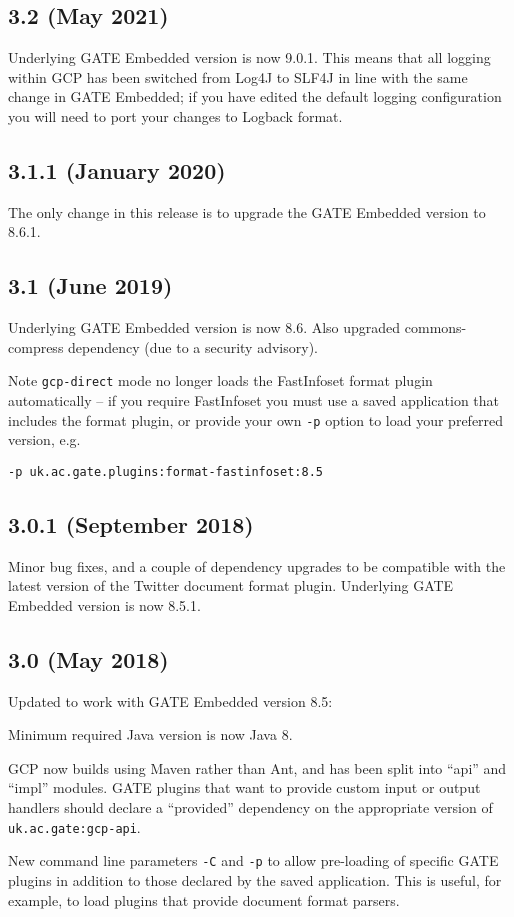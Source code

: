 \subsection{3.2 (May 2021)}

Underlying GATE Embedded version is now 9.0.1.  This means that all logging
within GCP has been switched from Log4J to SLF4J in line with the same change
in GATE Embedded; if you have edited the default logging configuration you
will need to port your changes to Logback format.

\subsection{3.1.1 (January 2020)}

The only change in this release is to upgrade the GATE Embedded version to
8.6.1.

\subsection{3.1 (June 2019)}

Underlying GATE Embedded version is now 8.6.  Also upgraded commons-compress
dependency (due to a security advisory).

Note \verb!gcp-direct! mode no longer loads the FastInfoset format plugin
automatically -- if you require FastInfoset you must use a saved application
that includes the format plugin, or provide your own \verb!-p! option to load
your preferred version, e.g.
\begin{verbatim}
-p uk.ac.gate.plugins:format-fastinfoset:8.5
\end{verbatim}

\subsection{3.0.1 (September 2018)}

Minor bug fixes, and a couple of dependency upgrades to be compatible with the
latest version of the Twitter document format plugin.  Underlying GATE Embedded
version is now 8.5.1.

\subsection{3.0 (May 2018)}

Updated to work with GATE Embedded version 8.5:
\bit
\item Minimum required Java version is now Java 8.
\item GCP now builds using Maven rather than Ant, and has been split into
  ``api'' and ``impl'' modules. GATE plugins that want to provide custom input
  or output handlers should declare a ``provided'' dependency on the
  appropriate version of \verb!uk.ac.gate:gcp-api!.
\item New command line parameters \verb!-C! and \verb!-p! to allow pre-loading
  of specific GATE plugins in addition to those declared by the saved
  application.  This is useful, for example, to load plugins that provide
  document format parsers.
\eit


